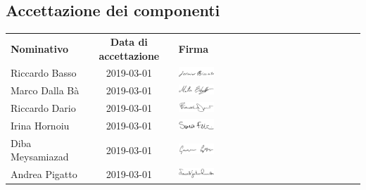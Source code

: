\subsection{Accettazione dei componenti}
\begin{table}[H]
	\centering\renewcommand{\arraystretch}{1.5}
	
	\begin{tabular}{l c M{0.35\textwidth}}
		
		
		\rowcolorhead 
		{ \textbf{Nominativo}} &
		{ \textbf{Data di accettazione}} &
		{ \textbf{Firma}}  \\
		
		\rowcolorlight
		Riccardo Basso & 2019-03-01 &   	\includegraphics[width=0.2\textwidth]{res/images/firme/federico.png}\\  
		\rowcolordark
		Marco Dalla Bà & 2019-03-01 &     	\includegraphics[width=0.2\textwidth]{res/images/firme/mattia.png}\\  
		\rowcolorlight
		Riccardo Dario & 2019-03-01 &   	\includegraphics[width=0.2\textwidth]{res/images/firme/francesco.png}\\  
		\rowcolordark
		Irina Hornoiu & 2019-03-01 &   	\includegraphics[width=0.2\textwidth]{res/images/firme/sara.png}\\  
		\rowcolorlight
		Diba Meysamiazad & 2019-03-01 &   	\includegraphics[width=0.2\textwidth]{res/images/firme/giacomo.png}\\ 
		\rowcolordark
		Andrea Pigatto & 2019-03-01 &   	\includegraphics[width=0.2\textwidth]{res/images/firme/samuele.png}\\   
	\end{tabular}
\end{table}

